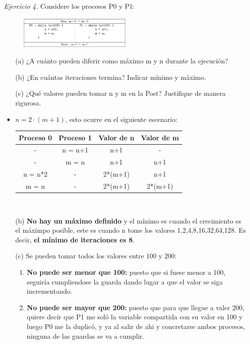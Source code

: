 \documentclass[12pt]{article}
\begin{document}
\noindent \textit{Ejercicio 4.} Considere los procesos P0 y P1:

\begin{figure}[h]
    \centering
    \includegraphics[width=0.5\textwidth]{c4.png}
\end{figure}

\begin{itemize}
    \item[(a)] ¿A cuánto pueden diferir como máximo m y n durante la ejecución?
    \item[(b)] ¿En cuántas iteraciones termina? Indicar mínimo y máximo.
    \item[(c)] ¿Qué valores pueden tomar n y m en la Post? Justifique de manera rigurosa.
\end{itemize}

\begin{rta}
    \begin{itemize}
            \item $n = 2\cdot(m+1)$, esto ocurre en el siguiente escenario: \newline
            \begin{tabular}{|c|c|c|c|}
                \hline
                \rowcolor{cyan!20} %
                \textbf{Proceso 0} & \textbf{Proceso 1} & \textbf{Valor de n} & \textbf{Valor de m}  \\
                \hline
                - & n = n+1 & n+1 & - \\
                - & m = n & n+1 & n+1 \\
                n = n*2 & - & 2*(m+1) & n+1 \\
                m = n & - & 2*(m+1) & 2*(m+1) \\
                \hline
            \end{tabular} \\
            \item[(b)] \textbf{No hay un máximo definido} y el mínimo es cuando el crecimiento es el máximpo posible, este es cuando n tome los valores 1,2,4,8,16,32,64,128. Es decir, \textbf{el mínimo de iteraciones es 8}.
            \item[(c)] Se pueden tomar todos los valores entre 100 y 200: 
            \begin{enumerate}
                \item \textbf{No puede ser menor que 100: } puesto que si fuese menor a 100, seguiría cumpliendose la guarda dando lugar a que el valor se siga incrementando.
                \item \textbf{No puede ser mayor que 200: } puesto que para que llegue a valer 200, quiere decir que P1 me soló la variable compartida con su valor en 100 y luego P0 me la duplicó, y ya al salir de ahi y concretarse ambos procesos, ninguna de las guardas se va a cumplir.
            \end{enumerate}
    \end{itemize}
\end{rta}
\end{document}
